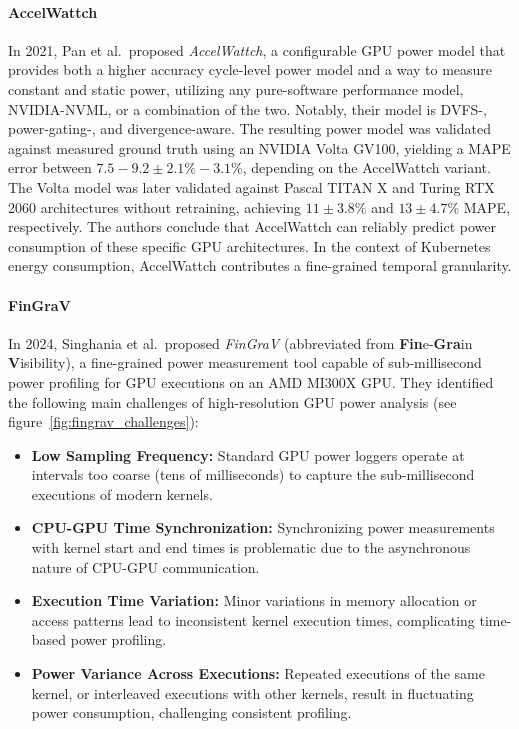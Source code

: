 \paragraph{AccelWattch}

In 2021, Pan et al.\ proposed \textit{AccelWattch}\parencite{kandiah2021accelwattch}, a configurable GPU power model that provides both a higher accuracy cycle-level power model and a way to measure constant and static power, utilizing any pure-software performance model, NVIDIA-NVML, or a combination of the two. Notably, their model is DVFS-, power-gating-, and divergence-aware. The resulting power model was validated against measured ground truth using an NVIDIA Volta GV100, yielding a MAPE error between $7.5-9.2 \pm 2.1\%-3.1\%$, depending on the AccelWattch variant. The Volta model was later validated against Pascal TITAN X and Turing RTX 2060 architectures without retraining, achieving $11 \pm 3.8\%$ and $13 \pm 4.7\%$ MAPE, respectively. The authors conclude that AccelWattch can reliably predict power consumption of these specific GPU architectures. In the context of Kubernetes energy consumption, AccelWattch contributes a fine-grained temporal granularity.

\paragraph{FinGraV}

In 2024, Singhania et al.\ proposed \textit{FinGraV}\parencite{singhania2024methodology} (abbreviated from \textbf{Fin}e-\textbf{Gra}in \textbf{V}isibility), a fine-grained power measurement tool capable of sub-millisecond power profiling for GPU executions on an AMD MI300X GPU. They identified the following main challenges of high-resolution GPU power analysis (see figure~\ref{fig:fingrav_challenges}):
\begin{itemize}
    \item \textbf{Low Sampling Frequency:} Standard GPU power loggers operate at intervals too coarse (tens of milliseconds) to capture the sub-millisecond executions of modern kernels.
    \item \textbf{CPU-GPU Time Synchronization:} Synchronizing power measurements with kernel start and end times is problematic due to the asynchronous nature of CPU-GPU communication.
    \item \textbf{Execution Time Variation:} Minor variations in memory allocation or access patterns lead to inconsistent kernel execution times, complicating time-based power profiling.
    \item \textbf{Power Variance Across Executions:} Repeated executions of the same kernel, or interleaved executions with other kernels, result in fluctuating power consumption, challenging consistent profiling.
\end{itemize}

